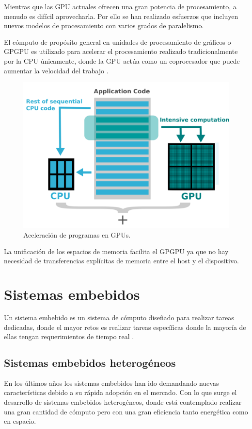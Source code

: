     Mientras que las GPU actuales ofrecen una gran potencia de procesamiento, a menudo es difícil aprovecharla. Por ello se han realizado esfuerzos que incluyen nuevos modelos de procesamiento con varios grados de paralelismo.
    
    El cómputo de propósito general en unidades de procesamiento de gráficos o GPGPU es utilizado para acelerar el procesamiento realizado tradicionalmente por la CPU únicamente, donde la GPU actúa como un coprocesador que puede aumentar la velocidad del trabajo \cite{GpuCpu}.

    \begin{figure}[ht]
      \centering
        \includegraphics[scale=0.9]{img/gpgpu}
        \caption{Aceleración de programas en GPUs\cite{gpgpu}.}
        \label{fig:gpgpu}
    \end{figure}

    La unificación de los espacios de memoria facilita el GPGPU ya que no hay necesidad de transferencias explícitas de memoria entre el host y el dispositivo.


    \section{Sistemas embebidos}

    Un sistema embebido es un sistema de cómputo diseñado para realizar tareas dedicadas, donde el mayor retos es realizar tareas específicas donde la mayoría de ellas tengan requerimientos de tiempo real \cite{LimPree}.

    \subsection{Sistemas embebidos heterogéneos}
    \vspace{0.3cm}
    En los últimos años los sistemas embebidos han ido demandando nuevas características debido a su rápida adopción en el mercado. Con lo que surge el desarrollo de sistemas embebidos heterogéneos, donde está contemplado realizar una gran cantidad de cómputo pero con una gran eficiencia tanto energética como en espacio.
    \vspace{0.3cm}

